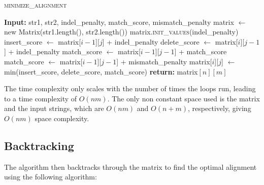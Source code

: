 \documentclass[12pt]{article}
\begin{document}
\begin{algorithm}[H]
    \caption{\textsc{minimize\_alignment}}
    \begin{algorithmic}[1]
        \State \textbf{Input:} str1, str2, indel\_penalty, match\_score, mismatch\_penalty
        \State matrix $\gets$ new Matrix(str1.length(), str2.length()) 
        \State matrix.\textsc{init\_values}(indel\_penalty) 
         
             
                \State insert\_score $\gets$ matrix[$i-1$][$j$] + indel\_penalty
                \State delete\_score $\gets$ matrix[$i$][$j-1$] + indel\_penalty
                    \State match\_score $\gets$ matrix[$i-1$][$j-1$] + match\_score
                \Else
                    \State match\_score $\gets$ matrix[$i-1$][$j-1$] + mismatch\_penalty
                \EndIf
                \State matrix[$i$][$j$] $\gets$ min(insert\_score, delete\_score, match\_score)
            \EndFor
        \EndFor
        \State \textbf{return:} matrix$[n][m]$
    \end{algorithmic}
\end{algorithm}

The time complexity only scales with the number of times the loops run,
leading to a time complexity of $O(nm)$. The only non constant space used
is the matrix and the input strings, which are $O(nm)$ and $O(n + m)$,
respectively, giving $O(nm)$ space complexity.


\subsection{Backtracking}

The algorithm then backtracks through the matrix to find the optimal
alignment using the following algorithm:
\end{document}
